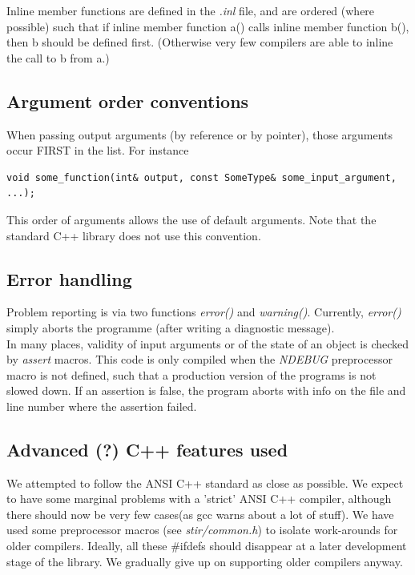 \documentclass{article}
\begin{document}
Inline member functions are defined in the \textit{.inl} file, and 
are ordered (where possible) such that if inline member function 
a() calls inline member function b(), 
then b should be defined first. (Otherwise very 
few compilers are able to inline the call to b 
from a.)



\subsection{
Argument order conventions}

When passing output arguments (by reference or by pointer), those 
arguments occur FIRST in the list. For instance
\begin{verbatim}
void some_function(int& output, const SomeType& some_input_argument, ...);
\end{verbatim}


This order of arguments allows the use of default arguments. 
Note that the standard C++ library does not use this convention.

\subsection{
Error handling }

Problem reporting is via two functions \textit{error()} and \textit{warning()}. 
Currently, \textit{error()} simply aborts the programme (after writing 
a diagnostic message). \\
In many places, validity of input arguments or of the state of 
an object is checked by \textit{assert} macros. This code is only 
compiled when the \textit{NDEBUG} preprocessor macro is not defined, 
such that a production version of the programs 
is not slowed down. If an assertion is false, the program aborts 
with info on the file and line number where the assertion failed.

\subsection{
Advanced (?) C++ features used}

We attempted to follow the ANSI C++ standard as close as possible. 
We expect to have some marginal problems with a 'strict' ANSI 
C++ compiler, although there should now be very few cases(as 
gcc warns about a lot of stuff). We have used some preprocessor 
macros (see \textit{stir/common.h}) to isolate work-arounds for older 
compilers. Ideally, all these \#ifdefs should disappear at a 
later development stage of the library. We gradually give up 
on supporting older compilers anyway.
\end{document}

